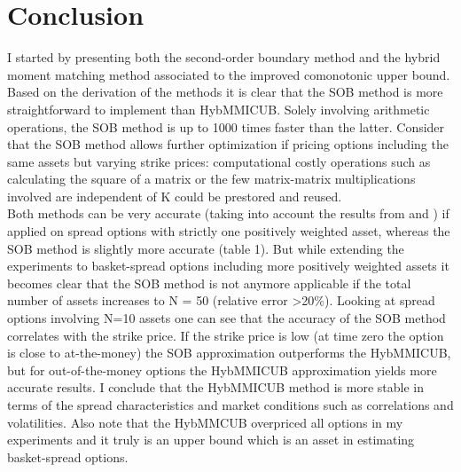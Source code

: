 \documentclass[a4paper]{article}
\begin{document}
\section{Conclusion}
\label{sec:conclusion}
I started by presenting both the second-order boundary method and the hybrid moment matching method associated to the improved comonotonic upper bound. Based on the derivation of the methods it is clear that the SOB method is more straightforward to implement than HybMMICUB. Solely involving arithmetic operations, the SOB method is up to 1000 times faster than the latter. Consider that the SOB method allows further optimization if pricing options including the same assets but varying strike prices: computational costly operations such as calculating the square of a matrix or the few matrix-matrix multiplications involved are independent of K could be prestored and reused.\\
Both methods can be very accurate (taking into account the results from \cite{sob} and \cite{hybmmicub}) if applied on spread options with strictly one positively weighted asset, whereas the SOB method is slightly more accurate (table 1).  But while extending the experiments to basket-spread options including more positively weighted assets it becomes clear that the SOB method is not anymore applicable if the total number of assets increases to N = 50 (relative error >20\%). Looking at spread options involving N=10 assets one can see that the accuracy of the SOB method correlates with the strike price. If the strike price is low (at time zero the option is close to at-the-money) the SOB approximation outperforms the HybMMICUB, but for out-of-the-money options the HybMMICUB approximation yields more accurate results. I conclude that the HybMMICUB method is more stable in terms of the spread characteristics and market conditions such as correlations and volatilities. Also note that the HybMMCUB overpriced all options in my experiments and it truly is an upper bound which is an asset in estimating basket-spread options.
\end{document}
